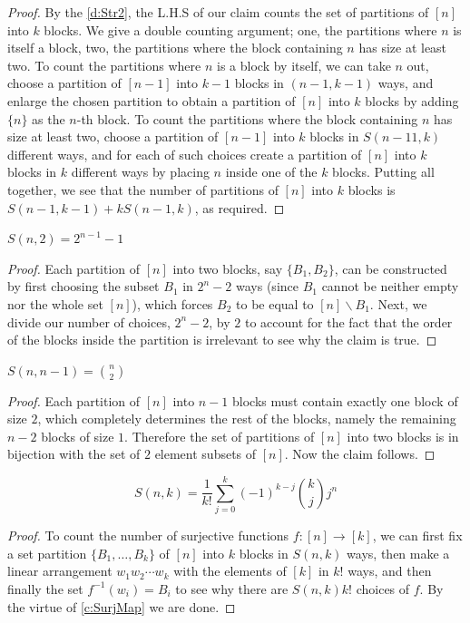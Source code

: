 \begin{proof}
By the \cref{d:Str2}, the L.H.S of our claim counts the set of partitions of $[n]$ into $k$ blocks. 
We give a double counting argument; 
one, the partitions where $n$ is itself a block, two, the partitions where the block containing $n$ has size at least two. To count the partitions where $n$ is a block by itself, we can take $n$ out, choose a partition of $[n-1]$ into $k-1$ blocks in $(n-1,k-1)$ ways, and enlarge the chosen partition to obtain a partition of $[n]$ into $k$ blocks by adding $\{n\}$ as the $n$-th block. To count the partitions where the block containing $n$ has size at least two, choose a partition of $[n-1]$ into $k$ blocks in $S(n-1 1,k)$ different ways, and for each of such choices create a partition of $[n]$ into $k$ blocks in $k$ different ways by placing $n$ inside one of the $k$ blocks. Putting all together, we see that the number of partitions of $[n]$ into $k$ blocks is $S(n-1, k-1)+kS(n-1, k)$, as required.
\end{proof}
\begin{claim}
    $S(n,2)=2^{n-1}-1$
\end{claim}
\begin{proof}
Each partition of $[n]$ into
two blocks, say $\{B_1, B_2\}$, can be constructed by first choosing the subset $B_1$ in $2^n-2$ ways (since $B_1$ cannot be neither empty nor the whole set $[n]$), which forces
$B_2$ to be equal to  $[n] \backslash B_1$. Next, we divide our number of choices, $2^n - 2$, by $2$ to account
for the fact that the order of the blocks inside the partition is irrelevant to see why the claim is true. 
\end{proof}
\begin{claim}
    $S(n,n-1)=\binom{n}{2}$
\end{claim}
\begin{proof}
Each partition of $[n]$ into $n-1$ blocks must contain exactly one block of size $2$, which completely determines the rest of the blocks, namely the remaining $n-2$ blocks of size $1$. Therefore the set of partitions of $[n]$ into two blocks is in bijection with the set of $2$ element subsets of $[n]$. Now the claim follows.
\end{proof}
\begin{claim}
    \[
    S(n,k) = \dfrac{1}{k!}\sum_{j=0}^{k}(-1)^{k-j}\binom{k}{j}j^n
    \]
\end{claim}
\begin{proof}
To count the number of surjective functions $f: [n] \to [k]$, we can first fix a set partition $\{B_1,\ldots,B_k\}$ of $[n]$ into $k$ blocks in $S(n,k)$ ways, then make a linear arrangement $w_1 w_2 \cdots w_k$ with the elements of $[k]$ in $k!$ ways, and then finally the set $f^{-1}(w_i) = B_i$ to see why there are $S(n, k)k!$ choices of $f$. By the virtue of \cref{c:SurjMap} we are done.
\end{proof}
